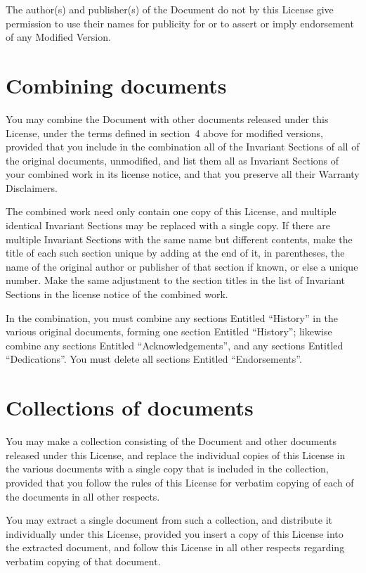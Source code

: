 \documentclass[a4paper,spanish,12pt]{book}
\begin{document}
The author(s) and publisher(s) of the Document do not by this License
give permission to use their names for publicity for or to assert or
imply endorsement of any Modified Version.


	\section{Combining documents}


You may combine the Document with other documents released under this
License, under the terms defined in section~4 above for modified
versions, provided that you include in the combination all of the
Invariant Sections of all of the original documents, unmodified, and
list them all as Invariant Sections of your combined work in its
license notice, and that you preserve all their Warranty Disclaimers.

The combined work need only contain one copy of this License, and
multiple identical Invariant Sections may be replaced with a single
copy.  If there are multiple Invariant Sections with the same name but
different contents, make the title of each such section unique by
adding at the end of it, in parentheses, the name of the original
author or publisher of that section if known, or else a unique number.
Make the same adjustment to the section titles in the list of
Invariant Sections in the license notice of the combined work.

In the combination, you must combine any sections Entitled ``History''
in the various original documents, forming one section Entitled
``History''; likewise combine any sections Entitled ``Acknowledgements'',
and any sections Entitled ``Dedications''.  You must delete all sections
Entitled ``Endorsements''.

\section{Collections of documents}

You may make a collection consisting of the Document and other documents
released under this License, and replace the individual copies of this
License in the various documents with a single copy that is included in
the collection, provided that you follow the rules of this License for
verbatim copying of each of the documents in all other respects.

You may extract a single document from such a collection, and distribute
it individually under this License, provided you insert a copy of this
License into the extracted document, and follow this License in all
other respects regarding verbatim copying of that document.
\end{document}
